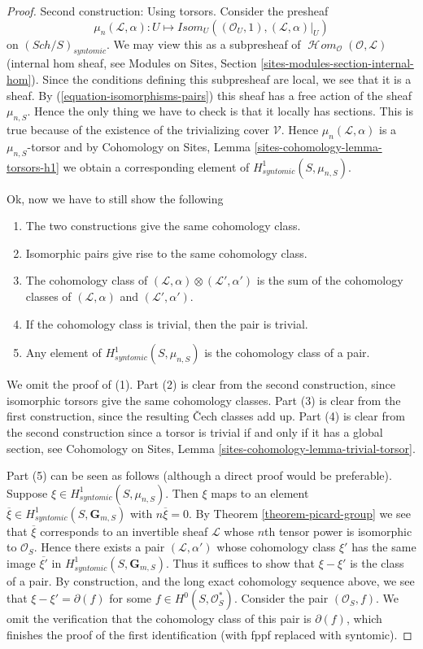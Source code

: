 \documentclass[10pt,a4paper]{amsart}
\theoremstyle{plain}
\theoremstyle{definition}
\theoremstyle{remark}
\numberwithin{equation}{subsection}
\def\SheafHom{\mathop{\mathcal{H}\!\mathit{om}}\nolimits}
\def\Sch{\mathit{Sch}}
\begin{document}
\begin{proof}
\medskip\noindent
Second construction: Using torsors. Consider the presheaf
$$
\mu_n(\mathcal{L}, \alpha) :
U
\longmapsto
\mathit{Isom}_U((\mathcal{O}_U, 1), (\mathcal{L}, \alpha)|_U)
$$
on $(\Sch/S)_{syntomic}$.
We may view this as a subpresheaf of
$\SheafHom_\mathcal{O}(\mathcal{O}, \mathcal{L})$ (internal hom
sheaf, see
Modules on Sites, Section \ref{sites-modules-section-internal-hom}).
Since the conditions defining this subpresheaf are local, we see that it is
a sheaf.
By (\ref{equation-isomorphisms-pairs}) this sheaf has a free action of
the sheaf $\mu_{n, S}$. Hence the only thing we have to check is that
it locally has sections. This is true because of the existence of the
trivializing cover $\mathcal{V}$. Hence $\mu_n(\mathcal{L}, \alpha)$
is a $\mu_{n, S}$-torsor and by
Cohomology on Sites, Lemma \ref{sites-cohomology-lemma-torsors-h1}
we obtain a corresponding element of $H^1_{syntomic}(S, \mu_{n, S})$.

\medskip\noindent
Ok, now we have to still show the following
\begin{enumerate}
\item The two constructions give the same cohomology class.
\item Isomorphic pairs give rise to the same cohomology class.
\item The cohomology class of
$(\mathcal{L}, \alpha) \otimes (\mathcal{L}', \alpha')$
is the sum of the cohomology classes of
$(\mathcal{L}, \alpha)$ and $(\mathcal{L}', \alpha')$.
\item If the cohomology class is trivial, then the pair is trivial.
\item Any element of $H^1_{syntomic}(S, \mu_{n, S})$ is the
cohomology class of a pair.
\end{enumerate}
We omit the proof of (1). Part (2) is clear from the second construction,
since isomorphic torsors give the same cohomology classes.
Part (3) is clear from the first construction, since the resulting
{\v C}ech classes add up. Part (4) is clear from the second construction
since a torsor is trivial if and only if it has a global section, see
Cohomology on Sites, Lemma \ref{sites-cohomology-lemma-trivial-torsor}.

\medskip\noindent
Part (5) can be seen as follows (although a direct proof would be
preferable). Suppose $\xi \in H^1_{syntomic}(S, \mu_{n, S})$.
Then $\xi$ maps to an element
$\overline{\xi} \in H^1_{syntomic}(S, \mathbf{G}_{m, S})$
with $n \overline{\xi} = 0$. By
Theorem \ref{theorem-picard-group}
we see that $\overline{\xi}$ corresponds to an invertible sheaf $\mathcal{L}$
whose $n$th tensor power is isomorphic to $\mathcal{O}_S$.
Hence there exists a pair $(\mathcal{L}, \alpha')$ whose cohomology
class $\xi'$ has the same image $\overline{\xi'}$ in
$H^1_{syntomic}(S, \mathbf{G}_{m, S})$. Thus it suffices to show
that $\xi - \xi'$ is the class of a pair. By construction, and the
long exact cohomology sequence above, we see that
$\xi - \xi' = \partial(f)$ for some $f \in H^0(S, \mathcal{O}_S^*)$.
Consider the pair $(\mathcal{O}_S, f)$. We omit the verification
that the cohomology class of this pair is $\partial(f)$, which
finishes the proof of the first identification (with fppf replaced
with syntomic).


\end{proof}
\end{document}
